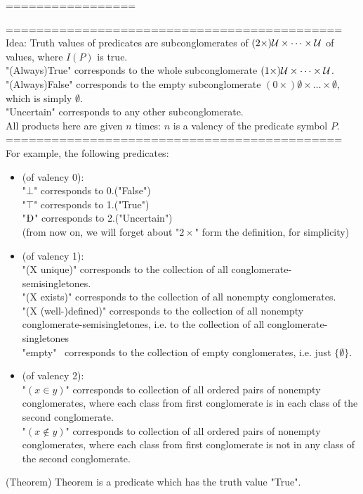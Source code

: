 =================


============================================\\
Idea: Truth values of predicates are subconglomerates of $(2\times)\mathcal{U}\times\dots\times\mathcal{U}$ of values, where $I(P)$ is true.\\
"(Always)True" corresponds to the whole subconglomerate $(1\times)\mathcal{U}\times\dots\times\mathcal{U}$.\\
"(Always)False" corresponds to the empty subconglomerate $(0\times)\emptyset\times\dots\times\emptyset$, which is simply $\emptyset$.\\
"Uncertain" corresponds to any other subconglomerate.\\
All products here are given $n$ times: $n$ is a valency of the predicate symbol $P$.
============================================\\

For example, the following predicates:\\
\begin{itemize}
\item (of valency 0):\\
"$\bot$" corresponds to 0.("False")\\
"$\top$" corresponds to 1.("True")\\
"$\uncert$" corresponds to 2.("Uncertain")\\
(from now on, we will forget about "$2\times$" form the definition, for simplicity)
\item (of valency 1):\\
"(X unique)" corresponds to the collection of all conglomerate-semisingletones.\\
"(X exists)" corresponds to the collection of all nonempty conglomerates.\\
"(X (well-)defined)" corresponds to the collection of all nonempty conglomerate-semisingletones, i.e. to the collection of all conglomerate-singletones\\
"empty" \ corresponds to the collection of empty conglomerates, i.e. just $\{\emptyset\}$.
\item (of valency 2):\\
"$(x\in y)$" corresponds to collection of all ordered pairs of nonempty conglomerates, where each class from first conglomerate is in each class of the second conglomerate.\\
"$(x\notin y)$" corresponds to collection of all ordered pairs of nonempty conglomerates, where each class from first conglomerate is not in any class of the second conglomerate.
\end{itemize}
\begin{definition}(Theorem)
Theorem is a predicate which has the truth value "True".\\
\end{definition}


